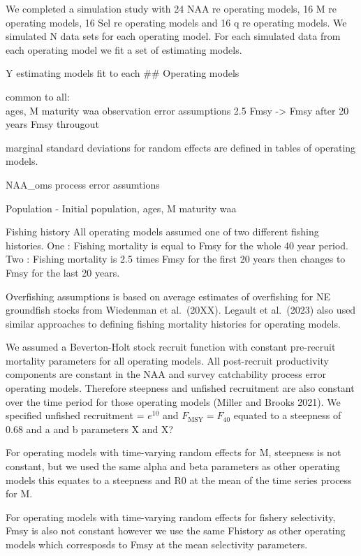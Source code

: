 \documentclass[
  12pt,
]{article}
\begin{document}
We completed a simulation study with 24 NAA re operating models, 16 M re
operating models, 16 Sel re operating models and 16 q re operating
models. We simulated N data sets for each operating model. For each
simulated data from each operating model we fit a set of estimating
models.

Y estimating models fit to each \#\# Operating models

common to all:\\
ages, M maturity waa observation error assumptions 2.5 Fmsy
-\textgreater{} Fmsy after 20 years Fmsy througout

marginal standard deviations for random effects are defined in tables of
operating models.

NAA\_oms process error assumtions

Population - Initial population, ages, M maturity waa

Fishing history All operating models assumed one of two different
fishing histories. One : Fishing mortality is equal to Fmsy for the
whole 40 year period. Two : Fishing mortality is 2.5 times Fmsy for the
first 20 years then changes to Fmsy for the last 20 years.

Overfishing assumptions is based on average estimates of overfishing for
NE groundfish stocks from Wiedenman et al.~(20XX). Legault et al.~(2023)
also used similar approaches to defining fishing mortality histories for
operating models.

We assumed a Beverton-Holt stock recruit function with constant
pre-recruit mortality parameters for all operating models. All
post-recruit productivity components are constant in the NAA and survey
catchability process error operating models. Therefore steepness and
unfished recruitment are also constant over the time period for those
operating models (Miller and Brooks 2021). We specified unfished
recruitment = \(e^10\) and \(F_{\text{MSY}} = F_{40}\) equated to a
steepness of 0.68 and a and b parameters X and X?

For operating models with time-varying random effects for M, steepness
is not constant, but we used the same alpha and beta parameters as other
operating models this equates to a steepness and R0 at the mean of the
time series process for M.

For operating models with time-varying random effects for fishery
selectivity, Fmsy is also not constant however we use the same Fhistory
as other operating models which corresposds to Fmsy at the mean
selectivity parameters.
\end{document}
